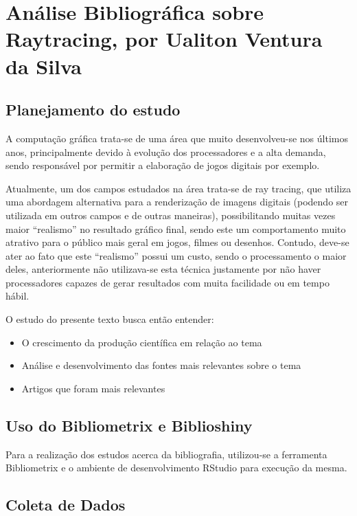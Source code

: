 \chapter{Análise Bibliográfica sobre Raytracing, por Ualiton Ventura da Silva\label{chap:bibliometria:uventura}}

\section{Planejamento do estudo}

A computação gráfica trata-se de uma área que muito desenvolveu-se nos últimos anos, principalmente devido à evolução dos processadores e a alta demanda, sendo responsável por permitir a elaboração de jogos digitais por exemplo.

Atualmente, um dos campos estudados na área trata-se de ray tracing, que utiliza uma abordagem alternativa para a renderização de imagens digitais (podendo ser utilizada em outros campos e de outras maneiras), possibilitando muitas vezes maior “realismo” no resultado gráfico final, sendo este um comportamento muito atrativo para o público mais geral em jogos, filmes ou desenhos. Contudo, deve-se ater ao fato que este “realismo” possui um custo, sendo o processamento o maior deles, anteriormente não utilizava-se esta técnica justamente por não haver processadores capazes de gerar resultados com muita facilidade ou em tempo hábil.

O estudo do presente texto busca então entender:
\begin{itemize}
    \item O crescimento da produção científica em relação ao tema
    \item Análise e desenvolvimento das fontes mais relevantes sobre o tema
    \item Artigos que foram mais relevantes
\end{itemize}

\section{Uso do Bibliometrix e Biblioshiny}

Para a realização dos estudos acerca da bibliografia, utilizou-se a ferramenta Bibliometrix e o ambiente de desenvolvimento RStudio para execução da mesma.

\section{Coleta de Dados}

